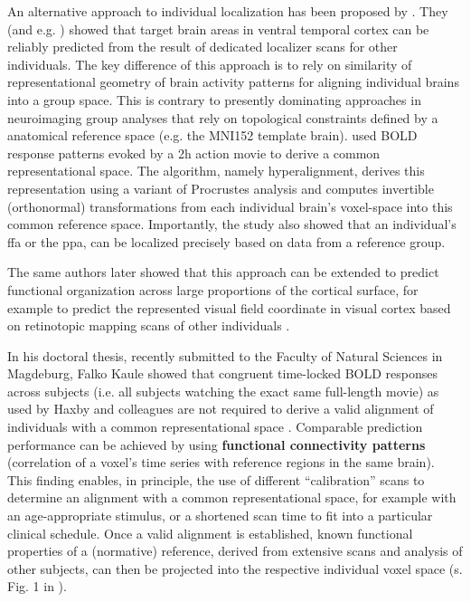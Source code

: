 %
An alternative approach to individual localization has been proposed by
\citet{haxby2011common}.
%
They (and e.g. \citet{jiahui2019predicting}) showed that target brain areas in
ventral temporal cortex can be reliably predicted from the result of dedicated
localizer scans for other individuals.
%
The key difference of this approach is to rely on similarity of representational
geometry of brain activity patterns for aligning individual brains into a group
space.
%
This is contrary to presently dominating approaches in neuroimaging group
analyses that rely on topological constraints defined by a anatomical reference
space (e.g. the MNI152 template brain).
%
\citet{haxby2011common} used BOLD response patterns evoked by a 2h action movie
to derive a common representational space.
%
The algorithm, namely hyperalignment, derives this representation using a
variant of Procrustes analysis and computes invertible (orthonormal)
transformations from each individual brain’s voxel-space into this common
reference space.
%
Importantly, the study also showed that an individual's \ac{ffa} or the
\ac{ppa}, can be localized precisely based on data from a reference group.

%
The same authors later showed that this approach can be extended to predict
functional organization across large proportions of the cortical surface, for
example to predict the represented visual field coordinate in visual cortex
based on retinotopic mapping scans of other individuals
\citep{guntupalli2016model}.

%
In his doctoral thesis, recently submitted to the Faculty of Natural Sciences in
Magdeburg, Falko Kaule showed that congruent time-locked BOLD responses across
subjects (i.e. all subjects watching the exact same full-length movie) as used
by Haxby and colleagues are not required to derive a valid alignment of
individuals with a common representational space \citep{kaule2017examination}.
%
Comparable prediction performance can be achieved by using \textbf{functional
connectivity patterns} (correlation of a voxel's time series with reference
regions in the same brain).
%
This finding enables, in principle, the use of different ``calibration'' scans
to determine an alignment with a common representational space, for example with
an age-appropriate stimulus, or a shortened scan time to fit into a particular
clinical schedule.
%
Once a valid alignment is established, known functional properties of a
(normative) reference, derived from extensive scans and analysis of other
subjects, can then be projected into the respective individual voxel space (s.
Fig. 1 in \citep{nishimoto2016lining}).


